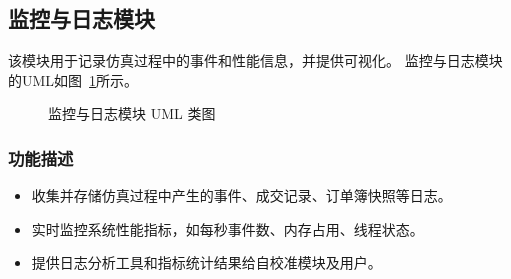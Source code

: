 \subsection{监控与日志模块}

该模块用于记录仿真过程中的事件和性能信息，并提供可视化。
监控与日志模块的UML如图~\ref{fig:uml_monitoring}所示。

\begin{figure}[htbp]
  \centering
  \resizebox{0.8\linewidth}{!}{}
  \caption{监控与日志模块 UML 类图}
  \label{fig:uml_monitoring}
\end{figure}

\subsubsection{功能描述}
\begin{itemize}
  \item 收集并存储仿真过程中产生的事件、成交记录、订单簿快照等日志。
  \item 实时监控系统性能指标，如每秒事件数、内存占用、线程状态。
  \item 提供日志分析工具和指标统计结果给自校准模块及用户。
\end{itemize}

